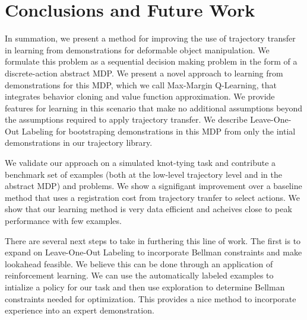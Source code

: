 \section{Conclusions and Future Work}
In summation, we present a method for improving the use of trajectory transfer in 
learning from demonstrations for deformable object manipulation. 
We formulate this problem as a sequential decision making
problem in the form of a discrete-action abstract MDP. We present a novel approach to 
learning from demonstrations for this MDP, which we call Max-Margin Q-Learning, that 
integrates behavior cloning and value function approximation. We provide
features for learning in this scenario that make no additional assumptions beyond
the assumptions required to apply trajectory transfer. We describe Leave-One-Out Labeling 
for bootstraping demonstrations in this MDP from only the intial demonstrations in our
trajectory library.

We validate our approach on a simulated knot-tying task and contribute a benchmark
set of examples (both at the low-level trajectory level and in the abstract MDP) and 
problems. We show a signifigant improvement over a baseline method that uses
a registration cost from trajectory tranfer to select actions. We show that our learning
method is very data efficient and acheives close to peak performance with few examples.

There are several next steps to take in furthering this line of work. The first is to
expand on Leave-One-Out Labeling to incorporate Bellman constraints and make lookahead 
feasible. We believe this can be done through an application of reinforcement learning.
We can use the automatically labeled examples to intialize a policy for our task and then
use exploration to determine Bellman constraints needed for optimization. This provides
a nice method to incorporate experience into an expert demonstration.
